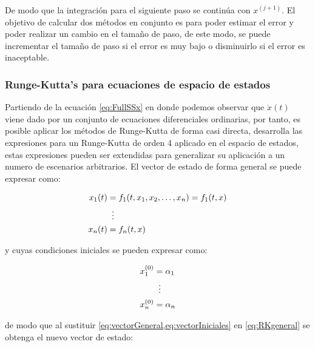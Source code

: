         De modo que la integración para el siguiente paso se continúa con $x^{(j+1)}$. El objetivo de calcular dos métodos en conjunto es para poder estimar el error y poder realizar un cambio en el tamaño de paso, de este modo, se puede incrementar el tamaño de paso si el error es muy bajo o disminuirlo si el error es inaceptable.
        
        \subsubsection{Runge-Kutta's para ecuaciones de espacio de estados}

            Partiendo de la ecuación \cref{eq:FullSSx} en donde podemos observar que $\dot{x}(t)$ viene dado por un conjunto de ecuaciones diferenciales ordinarias, por tanto, es posible aplicar los métodos de Runge-Kutta de forma casi directa, \textcite{horacio1997metodos} desarrolla las expresiones para un Runge-Kutta de orden 4 aplicado en el espacio de estados, estas expresiones pueden ser extendidas para generalizar su aplicación a un numero de escenarios arbitrarios. El vector de estado de forma general se puede expresar como:
            
            \begin{equation}\label{eq:vectorGeneral}
                \begin{aligned}
                    x_1(t) &= f_1(t, x_1, x_2, \dots, x_n) = f_1(t,x)\\
                    &\mathrel{\makebox[\widthof{=}]{\vdots}}\\
                    x_n(t) &=  f_n(t,x)
                \end{aligned}
            \end{equation}

            \noindent y cuyas condiciones iniciales se pueden expresar como:

            \begin{equation}\label{eq:vectorIniciales}
                \begin{aligned}
                    x_1^{(0)} &= \alpha_1\\
                    &\mathrel{\makebox[\widthof{=}]{\vdots}}\\
                    x_n^{(0)} &=  \alpha_n
                \end{aligned}
            \end{equation}
            
            \noindent de modo que al sustituir \cref{eq:vectorGeneral,eq:vectorIniciales} en \cref{eq:RKgeneral} se obtenga el nuevo vector de estado:

